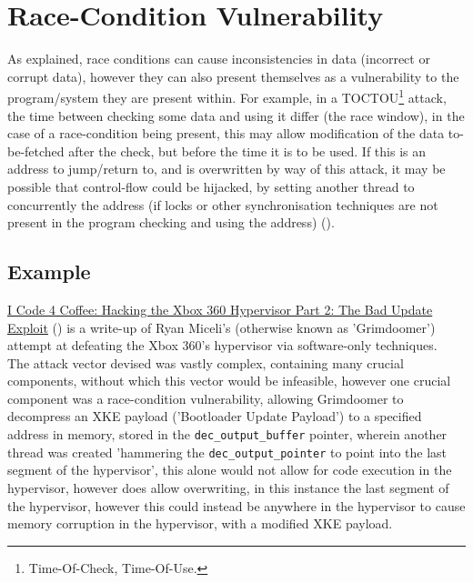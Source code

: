 \section{Race-Condition Vulnerability}
As explained, race conditions can cause inconsistencies in data (incorrect or corrupt data), however they can also present themselves as a vulnerability to the program/system they are present within. For example, in a TOCTOU\footnote{Time-Of-Check, Time-Of-Use.} attack, the time between checking some data and using it differ (the race window), in the case of a race-condition being present, this may allow modification of the data to-be-fetched after the check, but before the time it is to be used. If this is an address to jump/return to, and is overwritten by way of this attack, it may be possible that control-flow could be hijacked, by setting another thread to concurrently the address (if locks or other synchronisation techniques are not present in the program checking and using the address) (\cite{geeksRCV}).

\subsection{Example}
\href{https://icode4.coffee/?p=1081}{I Code 4 Coffee: Hacking the Xbox 360 Hypervisor Part 2: The Bad Update Exploit} (\cite{badUpdate}) is a write-up of Ryan Miceli's (otherwise known as 'Grimdoomer') attempt at defeating the Xbox 360's hypervisor via software-only techniques.\\
The attack vector devised was vastly complex, containing many crucial components, without which this vector would be infeasible, however one crucial component was a race-condition vulnerability, allowing Grimdoomer to decompress an XKE payload ('Bootloader Update Payload') to a specified address in memory, stored in the \texttt{dec\_output\_buffer} pointer, wherein another thread was created 'hammering the \texttt{dec\_output\_pointer} to point into the last segment of the hypervisor', this alone would not allow for code execution in the hypervisor, however does allow overwriting, in this instance the last segment of the hypervisor, however this could instead be anywhere in the hypervisor to cause memory corruption in the hypervisor, with a modified XKE payload.